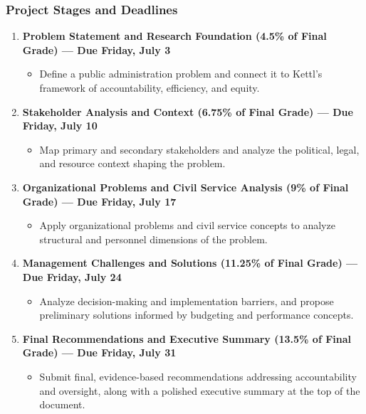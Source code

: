 \documentclass[12pt]{article}
\begin{document}
\subsubsection*{Project Stages and Deadlines}
\begin{enumerate}
    \item \textbf{Problem Statement and Research Foundation (4.5\% of Final Grade) --- Due Friday, July 3}
    \begin{itemize}
        \item Define a public administration problem and connect it to Kettl's framework of accountability, efficiency, and equity.
    \end{itemize}

    \item \textbf{Stakeholder Analysis and Context (6.75\% of Final Grade) --- Due Friday, July 10}
    \begin{itemize}
        \item Map primary and secondary stakeholders and analyze the political, legal, and resource context shaping the problem.
    \end{itemize}

    \item \textbf{Organizational Problems and Civil Service Analysis (9\% of Final Grade) --- Due Friday, July 17}
    \begin{itemize}
        \item Apply organizational problems and civil service concepts to analyze structural and personnel dimensions of the problem.
    \end{itemize}

    \item \textbf{Management Challenges and Solutions (11.25\% of Final Grade) --- Due Friday, July 24}
    \begin{itemize}
        \item Analyze decision-making and implementation barriers, and propose preliminary solutions informed by budgeting and performance concepts.
    \end{itemize}

    \item \textbf{Final Recommendations and Executive Summary (13.5\% of Final Grade) --- Due Friday, July 31}
    \begin{itemize}
        \item Submit final, evidence-based recommendations addressing accountability and oversight, along with a polished executive summary at the top of the document.
    \end{itemize}
\end{enumerate}
\end{document}
